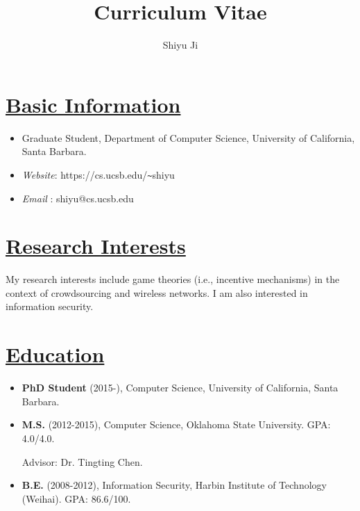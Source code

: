 \documentclass{article}
\newlength{\nL}
\newcommand{\underLineText}[1]{\settowidth{\nL}{#1}\setlength{\nL}{0.95\textwidth-\nL}\underline{{\sc #1}\hspace{\nL}}}
\begin{document}
\title{\bf Curriculum Vitae}
\author{Shiyu Ji}
\date{}
\maketitle

\section*{\underLineText{Basic Information}}
\begin{itemize}
\item Graduate Student, Department of Computer Science, University of California, Santa Barbara.
\item {\it Website}: https://cs.ucsb.edu/\verb+~+shiyu
\item {\it Email} \Letter: shiyu@cs.ucsb.edu
\end{itemize}

\section*{\underLineText{Research Interests}}
My research interests include game theories (i.e., incentive mechanisms) in the context of crowdsourcing and wireless networks. I am also interested in information security.

\section*{\underLineText{Education}}
\begin{itemize}
\item {\bf PhD Student} (2015-), Computer Science, University of California, Santa Barbara.

\item {\bf M.S.} (2012-2015), Computer Science, Oklahoma State University. GPA: 4.0/4.0.

Advisor: Dr. Tingting Chen.

\item {\bf B.E.} (2008-2012), Information Security, Harbin Institute of Technology (Weihai). GPA: 86.6/100.
\end{itemize}
\end{document}
